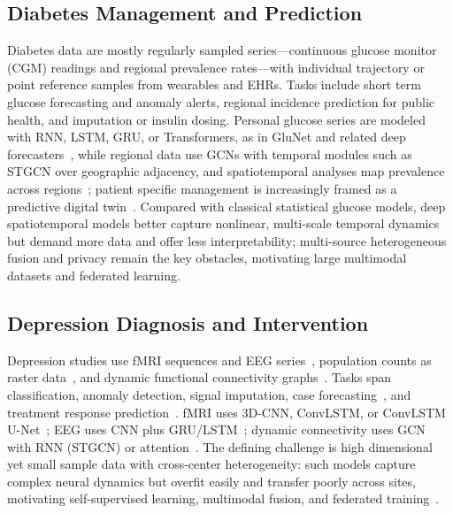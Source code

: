 \documentclass[journal]{IEEEtran}
\begin{document}
\subsection{Diabetes Management and Prediction}
Diabetes data are mostly regularly sampled series---continuous glucose monitor (CGM) readings and regional prevalence rates---with individual trajectory or point reference samples from wearables and EHRs. Tasks include short term glucose forecasting and anomaly alerts, regional incidence prediction for public health, and imputation or insulin dosing. Personal glucose series are modeled with RNN, LSTM, GRU, or Transformers, as in GluNet and related deep forecasters~\cite{Li2020GluNet,Lim2025VirtualCGM}, while regional data use GCNs with temporal modules such as STGCN over geographic adjacency, and spatiotemporal analyses map prevalence across regions~\cite{XiaoLi2016DiabetesSpatiotemporal}; patient specific management is increasingly framed as a predictive digital twin~\cite{Faruqui2024}. Compared with classical statistical glucose models, deep spatiotemporal models better capture nonlinear, multi-scale temporal dynamics but demand more data and offer less interpretability; multi-source heterogeneous fusion and privacy remain the key obstacles, motivating large multimodal datasets and federated learning.

\subsection{Depression Diagnosis and Intervention}
Depression studies use fMRI sequences and EEG series~\cite{2,4}, population counts as raster data~\cite{3}, and dynamic functional connectivity graphs~\cite{4,9}. Tasks span classification, anomaly detection, signal imputation, case forecasting~\cite{3}, and treatment response prediction~\cite{4}. fMRI uses 3D-CNN, ConvLSTM, or ConvLSTM U-Net~\cite{9}; EEG uses CNN plus GRU/LSTM~\cite{2}; dynamic connectivity uses GCN with RNN (STGCN) or attention~\cite{4}. The defining challenge is high dimensional yet small sample data with cross-center heterogeneity: such models capture complex neural dynamics but overfit easily and transfer poorly across sites, motivating self-supervised learning, multimodal fusion, and federated training~\cite{9}.
\end{document}
